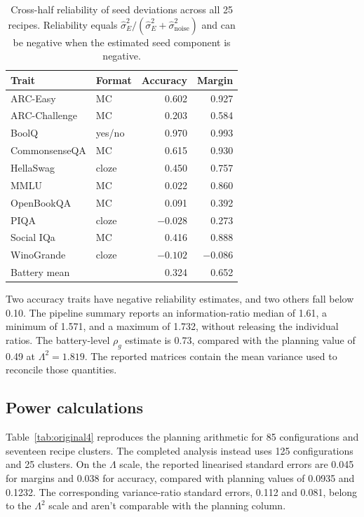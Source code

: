 \begin{table}[htbp]
\centering\small
\caption{Cross-half reliability of seed deviations across all 25 recipes. Reliability equals $\widehat\sigma_E^2/(\widehat\sigma_E^2+\widehat\sigma_{\mathrm{noise}}^2)$ and can be negative when the estimated seed component is negative.}
\label{tab:original3}
\begin{tabular}{llrr}\hline
Trait & Format & Accuracy & Margin\\\hline
ARC-Easy & MC & 0.602 & 0.927\\
ARC-Challenge & MC & 0.203 & 0.584\\
BoolQ & yes/no & 0.970 & 0.993\\
CommonsenseQA & MC & 0.615 & 0.930\\
HellaSwag & cloze & 0.450 & 0.757\\
MMLU & MC & 0.022 & 0.860\\
OpenBookQA & MC & 0.091 & 0.392\\
PIQA & cloze & $-0.028$ & 0.273\\
Social IQa & MC & 0.416 & 0.888\\
WinoGrande & cloze & $-0.102$ & $-0.086$\\
Battery mean & & 0.324 & 0.652\\\hline
\end{tabular}
\end{table}

Two accuracy traits have negative reliability estimates, and two others fall below 0.10. The pipeline summary reports an information-ratio median of 1.61, a minimum of 1.571, and a maximum of 1.732, without releasing the individual ratios. The battery-level $\rho_g$ estimate is 0.73, compared with the planning value of 0.49 at $\Lambda^2=1.819$. The reported matrices contain the mean variance used to reconcile those quantities.

\subsection{Power calculations}
Table~\ref{tab:original4} reproduces the planning arithmetic for 85 configurations and seventeen recipe clusters. The completed analysis instead uses 125 configurations and 25 clusters. On the $\Lambda$ scale, the reported linearised standard errors are 0.045 for margins and 0.038 for accuracy, compared with planning values of 0.0935 and 0.1232. The corresponding variance-ratio standard errors, 0.112 and 0.081, belong to the $\Lambda^2$ scale and aren't comparable with the planning column.

